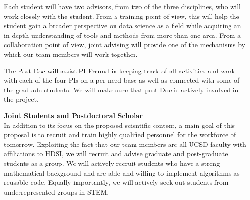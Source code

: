 \documentclass{article}
\begin{document}
Each student will have two advisors, from two of the three
disciplines, who will work closely with the student. From a training
point of view, this will help the student gain a broader perspective
on data science as a field while acquiring an in-depth understanding
of tools and methods from more than one area. From a collaboration
point of view, joint advising will provide one of the mechanisms by
which our team members will work together.

The Post Doc will assist PI Freund in keeping track of all activities and work with each of the four PIs on a per need base as well as connected with some of the graduate students. We will make sure that post Doc is actively involved in the project.\hfill
\fi
{}

%
%
\smallskip
{\bf Joint Students and Postdoctoral Scholar}\\
In addition to its focus on the proposed scientific content, a main goal of this proposal is to recruit and train highly qualified personnel for the workforce of tomorrow. Exploiting the fact that our team members are all UCSD faculty with affiliations to HDSI, we will recruit and advise graduate and post-graduate students as a
group. We will actively recruit students who have a strong
mathematical background and are able and willing to implement
algorithms as reusable code. Equally importantly, we will actively seek out students from underrepresented groups in STEM. 
\end{document}
